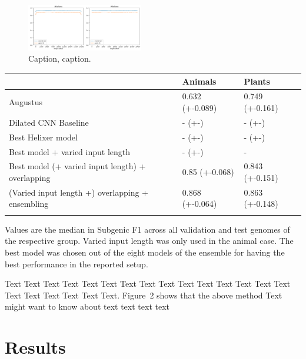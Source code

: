 \documentclass{bioinfo}
\begin{document}
\begin{figure}[!tpb]
	\centerline{\includegraphics[width=0.45\textwidth]{images/length_wise_bias}}
\caption{Caption, caption.}\label{fig:length_wise_bias}
\end{figure}


\begin{table}[!t]
 {
\begin{tabular}{@{}lll@{}}
\toprule & Animals & Plants\\
\midrule
Augustus & 0.632 (+-0.089) & 0.749 (+-0.161)\\
Dilated CNN Baseline & - (+-) & - (+-)\\
Best Helixer model & - (+-) & - (+-) \\
Best model + varied input length & - (+-) & - \\
Best model (+ varied input length) + overlapping &  0.85 (+-0.068) & 0.843 (+-0.151) \\
(Varied input length +) overlapping + ensembling & 0.868 (+-0.064) & 0.863 (+-0.148) \\
\botrule
\end{tabular}}{Values are the median in Subgenic F1 across all validation and test genomes of the respective group. Varied input length was only used in the animal case. The best model was chosen out of the eight models of the ensemble for having the best performance in the reported setup.}
\end{table}

Text Text Text Text Text Text  Text Text Text Text Text Text Text
Text Text  Text Text Text Text Text Text.
Figure~2\vphantom{\ref{fig:02}} shows that the above method  Text
\citealp{Boffelli03} might want to know about  text text text text

\section{Results}
\end{document}
